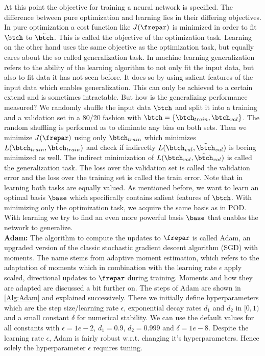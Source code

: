 At this point the objective for training a neural network is specified. The difference between pure optimization and learning lies in their differing objectives. In pure optimization a cost function like \(J(\frepar)\) is minimized in order to fit \(\btch\) to \(\tilde{\btch}\). This is called the objective of the optimization task. Learning on the other hand uses the same objective as the optimization task, but equally cares about the so called generalization task. In machine learning generalization refers to the ability of the learning algorithm to not only fit the input data, but also to fit data it has not seen before. It does so by using salient features of the input data which enables generalization. This can only be achieved to a certain extend and is sometimes intractable. But how is the generalizing performance measured? We randomly shuffle the input data \(\btch\) and split it into a training and a validation set in a 80/20 fashion with \(\btch=\{\btch_{train},\btch_{val}\}\). The random shuffling is performed as to eliminate any bias on both sets. Then we minimize \(J(\frepar)\) using only \(\btch_{train}\) which minimizes \(L(\btch_{train},\tilde{\btch}_{train})\) and check if indirectly \(L(\btch_{val},\tilde{\btch}_{val})\) is beeing minimized as well. The indirect minimization of \(L(\btch_{val},\tilde{\btch}_{val})\) is called the generalization task. The loss over the validation set is called the validation error and the loss over the training set is called the train error. Note that in learning both tasks are equally valued. As mentioned before, we want to learn an optimal basis \(\base\) which specifically contains salient features of \(\btch\). With minimizing only the optimization task, we acquire the same basis as in POD. With learning we try to find an even more powerful basis \(\base\) that enables the network to generalize.\\ 
\textbf{Adam:}
The algorithm to compute the updates to \(\frepar\) is called Adam, an upgraded version of the classic stochastic gradient descent algorithm (SGD) with moments. The name stems from adaptive moment estimation, which refers to the adaptation of moments which in combination with the learning rate \(\epsilon\) apply scaled, directional updates to \(\frepar\) during training. Moments and how they are adapted are discussed a bit further on. The steps of Adam are shown in \cref{Alg:Adam} and explained successively. There we initially define hyperparameters which are the step size/learning rate \(\epsilon\), exponential decay rates \(d_1\) and \(d_2\) in \([0,1)\) and a small constant \(\delta\) for numerical stability. We can use the default values for all constants with \(\epsilon=1e-2\), \(d_1=0.9\), \(d_2=0.999\) and \(\delta=1e-8\).  Despite the learning rate \(\epsilon\), Adam is fairly robust w.r.t. changing it's hyperparameters. Hence solely the hyperparameter \(\epsilon\) requires tuning.
